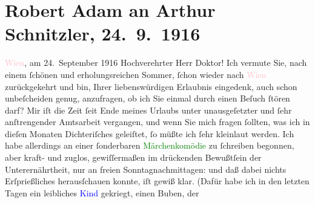 

               \section[Robert Adam an Arthur Schnitzler, 24. 9. 1916]{ Robert Adam an Arthur Schnitzler, 24. 9. 1916}\nopagebreak{}\rehead{ }\normalsize\beginnumbering{} \toendnotes[C]{\smallbreak\pagebreak[2]} 
\toendnotes[C]{\smallbreak}\pstart
           \raggedleft{}{\pb}\textcolor{pink}{Wien}{}\ledrightnote{\textcolor{pink}{Wien}}, am 24. September 1916\pend
           \pstart{}Hochverehrter Herr Doktor!\pend\pstart
           Ich vermute Sie, nach einem ſchönen und erholungsreichen Sommer, ſchon wieder
                    nach \textcolor{pink}{Wien}{}\ledrightnote{\textcolor{pink}{Wien}} zurückgekehrt und bin, Ihrer
                    liebenswürdigen Erlaubnis eingedenk, auch schon unbeſcheiden genug, anzufragen,
                    ob ich Sie einmal durch einen Beſuch ſtören darf?\pend
           \pstart
           Mir iſt die Zeit ſeit Ende meines Urlaubs unter unausgeſetzter und ſehr
                    anſtrengender Amtsarbeit vergangen, und wenn Sie mich fragen ſollten, was ich in
                    dieſen Monaten Dichteriſches geleiſtet, ſo müßte ich ſehr kleinlaut werden. Ich
                    habe allerdings an einer {\pb}ſonderbaren \textcolor{green}{Märchenkomödie}{} zu ſchreiben
                    begonnen, aber kraft- und zuglos, gewiſſermaßen  im drückenden Bewußtſein der Unterernährtheit, nur an freien
                    Sonntagnachmittagen: und daß dabei nichts Erſprießliches herausſchauen konnte,
                    iſt gewiß klar.\pend
           \pstart
           (Dafür habe ich in den letzten Tagen ein leibliches \textcolor{blue}{Kind}{} gekriegt, einen Buben, der
